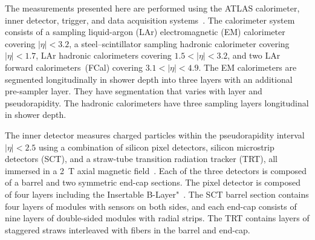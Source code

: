 
The measurements presented here are performed using the ATLAS calorimeter, inner detector, trigger,
and data acquisition systems~\cite{Aad:2008zzm}. 
The calorimeter system consists of a sampling liquid-argon (LAr) electromagnetic (EM) calorimeter covering $|\eta|<3.2$, a
steel--scintillator sampling hadronic calorimeter covering $|\eta| <1.7$, LAr hadronic calorimeters covering $1.5 < |\eta| < 3.2$, and
two LAr forward calorimeters~(FCal) covering $3.1 < |\eta| <
4.9$. 
The EM calorimeters are segmented longitudinally in shower depth into three
layers with an additional pre-sampler layer. They
have segmentation that varies with layer and pseudorapidity. 
The hadronic calorimeters have three sampling layers longitudinal
in shower depth.

The inner detector measures charged particles  within the pseudorapidity interval  $|\eta|<2.5$ using a combination of silicon pixel detectors, silicon microstrip detectors (SCT), and a straw-tube transition radiation tracker (TRT), all immersed in a 2~T axial magnetic field~\cite{Aad:2008zzm}. Each of the three detectors is composed of a barrel and two symmetric end-cap sections. The pixel detector is composed of four layers including the Insertable B-Layer"~\cite{ibl1,ibl2}. The SCT barrel section contains four layers of modules with sensors on both sides, and each end-cap consists of nine layers of double-sided modules with radial strips. The TRT contains layers of staggered straws interleaved with fibers in the barrel and end-cap.



